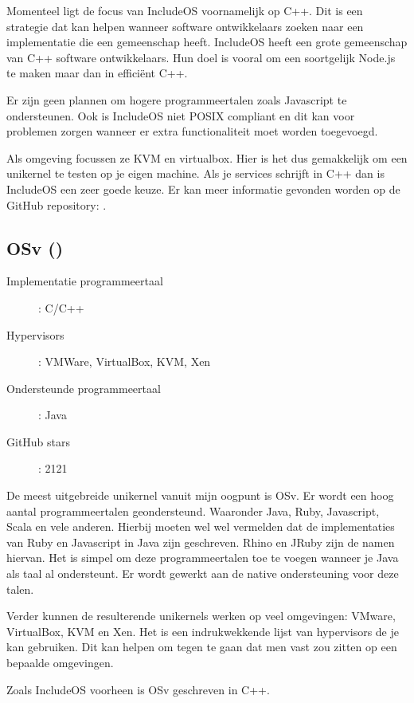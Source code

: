 \documentclass[pdftex,a4paper,12pt,twoside]{report}
\begin{document}
Momenteel ligt de focus van IncludeOS voornamelijk op C++. Dit is een strategie dat kan helpen wanneer software ontwikkelaars zoeken naar een implementatie die een gemeenschap heeft. IncludeOS heeft een grote gemeenschap van C++ software ontwikkelaars. Hun doel is vooral om een soortgelijk Node.js te maken maar dan in efficiënt C++.

Er zijn geen plannen om hogere programmeertalen zoals Javascript te ondersteunen. Ook is IncludeOS niet POSIX compliant en dit kan voor problemen zorgen wanneer er extra functionaliteit moet worden toegevoegd.

Als omgeving focussen ze KVM en virtualbox. Hier is het dus gemakkelijk om een unikernel te testen op je eigen machine. Als je services schrijft in C++ dan is IncludeOS een zeer goede keuze. Er kan meer informatie gevonden worden op de GitHub repository: \cite{oslo_and_akershus_university_college_hioa-cs/includeos_????}.

\subsection{OSv (\cite{cloudius-systems/osv_0000})}

\begin{description}
  \item [Implementatie programmeertaal]: C/C++
  \item [Hypervisors]: VMWare, VirtualBox, KVM, Xen
  \item [Ondersteunde programmeertaal]: Java
  \item [GitHub stars]: 2121
\end{description}

De meest uitgebreide unikernel vanuit mijn oogpunt is OSv. Er wordt een hoog aantal programmeertalen geondersteund. Waaronder Java, Ruby, Javascript, Scala en vele anderen. Hierbij moeten wel wel vermelden dat de implementaties van Ruby en Javascript in Java zijn geschreven. Rhino en JRuby zijn de namen hiervan. Het is simpel om deze programmeertalen toe te voegen wanneer je Java als taal al ondersteunt. Er wordt gewerkt aan de native ondersteuning voor deze talen.

Verder kunnen de resulterende unikernels werken op veel omgevingen: VMware, VirtualBox, KVM en Xen. Het is een indrukwekkende lijst van hypervisors de je kan gebruiken. Dit kan helpen om tegen te gaan dat men vast zou zitten op een bepaalde omgevingen.

Zoals IncludeOS voorheen is OSv geschreven in C++.
\end{document}
